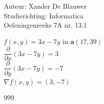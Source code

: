 \documentclass[a4paper]{article}
\begin{document}
\noindent \large Auteur: Xander De Blauwer \\
\noindent \large Studierichting: Informatica\\
\noindent \large Oefeningenreeks 7A nr. 13.1\\

\medskip

\normalsize

$f(x,y) = 3x - 7y$ in $\mathbf{a}(17,39)$ \\

$\dfrac{\partial }{\partial x}(3x-7y) = 3 $ \\

$\dfrac{\partial }{\partial y}(3x-7y) = -7 $ \\

$\nabla f(x,y) = (3, -7) $ \\




\begin{thebibliography}{999}
\end{thebibliography}
\end{document}
